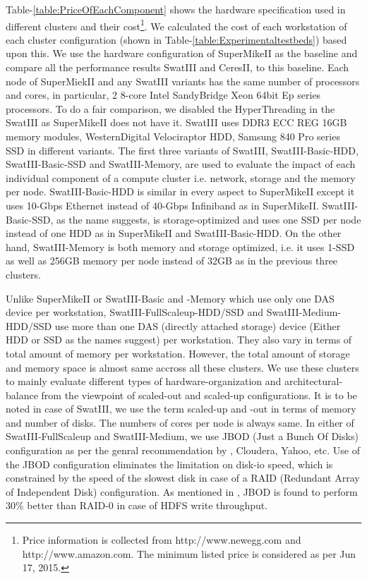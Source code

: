 \documentclass[conference]{IEEEtran}
\begin{document}
Table-\ref{table:PriceOfEachComponent} shows the hardware specification used in different clusters and their cost\footnote{Price information is collected from http://www.newegg.com and http://www.amazon.com. The minimum listed price is considered as per Jun 17, 2015.}. We calculated the cost of each workstation of each cluster configuration (shown in Table-\ref{table:Experimentaltestbeds}) based upon  this.
We use the hardware configuration of SuperMikeII as the baseline and compare all the performance results SwatIII and CeresII, to this baseline. 
Each node of SuperMiekII and any SwatIII variants has the same number of processors and cores, in particular, 2 8-core Intel SandyBridge Xeon 64bit Ep series processors. 
To do a fair comparison, we disabled the HyperThreading in the SwatIII as SuperMikeII does not have it. 
SwatIII uses DDR3 ECC REG 16GB memory modules, WesternDigital Velociraptor HDD, Samsung 840 Pro series SSD in different variants. 
The first three variants of SwatIII, SwatIII-Basic-HDD, SwatIII-Basic-SSD and SwatIII-Memory, are used to evaluate the impact of each individual component of a compute cluster i.e. network, storage and the memory per node. 
SwatIII-Basic-HDD is similar in every aspect to SuperMikeII except it uses 10-Gbps Ethernet instead of 40-Gbps Infiniband as in SuperMikeII. 
SwatIII-Basic-SSD, as the name suggests, is storage-optimized and uses one SSD per node instead of one HDD as in SuperMikeII and SwatIII-Basic-HDD.
On the other hand, SwatIII-Memory is both memory and storage optimized, i.e. it uses 1-SSD as well as 256GB memory per node instead of 32GB as in the previous three clusters. 

Unlike SuperMikeII or SwatIII-Basic and -Memory which use only one DAS device per workstation, SwatIII-FullScaleup-HDD/SSD and SwatIII-Medium-HDD/SSD use more than one DAS (directly attached storage) device (Either HDD or SSD as the names suggest) per workstation. 
They also vary in terms of total amount of memory per workstation.
However, the total amount of storage and memory space is almost same accross all these clusters. 
We use these clusters to mainly evaluate different types of hardware-organization and architectural-balance from the viewpoint of scaled-out and scaled-up configurations. 
It is to be noted in case of SwatIII, we use the term scaled-up and -out in terms of memory and number of disks. The numbers of cores per node is always same. 
In either of SwatIII-FullScaleup and SwatIII-Medium, we use JBOD (Just a Bunch Of Disks) configuration as per the genral recommendation by \cite{fw:hadoop}, Cloudera, Yahoo, etc. 
Use of the JBOD configuration eliminates the limitation on disk-io speed, which is constrained by the speed of the slowest disk in case of a RAID (Redundant Array of Independent Disk) configuration. 
As mentioned in \cite{fw:hadoop}, JBOD is found to perform 30\% better than RAID-0 in case of HDFS write throughput. 
\end{document}
